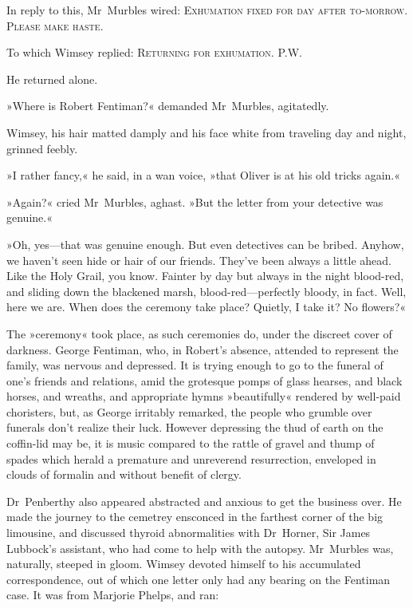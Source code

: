 In reply to this, Mr~Murbles wired: \textsc{Exhumation fixed for day after to-morrow. Please make haste.}

To which Wimsey replied: \textsc{Returning for exhumation. P.W.}

He returned alone.

»Where is Robert Fentiman?« demanded Mr~Murbles, agitatedly.

Wimsey, his hair matted damply and his face white from traveling day and night, grinned feebly.

»I rather fancy,« he said, in a wan voice, »that Oliver is at his old tricks again.«

»Again?« cried Mr~Murbles, aghast. »But the letter from your detective was genuine.«

»Oh, yes—that was genuine enough. But even detectives can be bribed. Anyhow, we haven't seen hide or hair of our friends. They've been always a little ahead. Like the Holy Grail, you know. Fainter by day but always in the night blood-red, and sliding down the blackened marsh, blood-red—perfectly bloody, in fact. Well, here we are. When does the ceremony take place? Quietly, I take it? No flowers?«

The »ceremony« took place, as such ceremonies do, under the discreet cover of darkness. George Fentiman, who, in Robert's absence, attended to represent the family, was nervous and depressed. It is trying enough to go to the funeral of one's friends and relations, amid the grotesque pomps of glass hearses, and black horses, and wreaths, and appropriate hymns »beautifully« rendered by well-paid choristers, but, as George irritably remarked, the people who grumble over funerals don't realize their luck. However depressing the thud of earth on the coffin-lid may be, it is music compared to the rattle of gravel and thump of spades which herald a premature and unreverend resurrection, enveloped in clouds of formalin and without benefit of clergy.

Dr~Penberthy also appeared abstracted and anxious to get the business over. He made the journey to the cemetrey ensconced in the farthest corner of the big limousine, and discussed thyroid abnormalities with Dr~Horner, Sir James Lubbock's assistant, who had come to help with the autopsy. Mr~Murbles was, naturally, steeped in gloom. Wimsey devoted himself to his accumulated correspondence, out of which one letter only had any bearing on the Fentiman case. It was from Marjorie Phelps, and ran:

